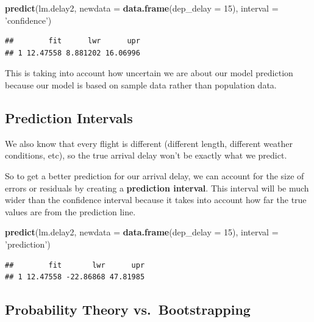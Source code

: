 \documentclass[]{book}
\newenvironment{Shaded}{\begin{snugshade}}{\end{snugshade}}
\newcommand{\DataTypeTok}[1]{\textcolor[rgb]{0.13,0.29,0.53}{#1}}
\newcommand{\DecValTok}[1]{\textcolor[rgb]{0.00,0.00,0.81}{#1}}
\newcommand{\KeywordTok}[1]{\textcolor[rgb]{0.13,0.29,0.53}{\textbf{#1}}}
\newcommand{\NormalTok}[1]{#1}
\newcommand{\StringTok}[1]{\textcolor[rgb]{0.31,0.60,0.02}{#1}}
\begin{document}
\begin{Shaded}
\begin{Highlighting}[]
\KeywordTok{predict}\NormalTok{(lm.delay2, }\DataTypeTok{newdata =} \KeywordTok{data.frame}\NormalTok{(}\DataTypeTok{dep_delay =} \DecValTok{15}\NormalTok{), }\DataTypeTok{interval =} \StringTok{'confidence'}\NormalTok{)}
\end{Highlighting}
\end{Shaded}

\begin{verbatim}
##        fit      lwr      upr
## 1 12.47558 8.881202 16.06996
\end{verbatim}

This is taking into account how uncertain we are about our model prediction because our model is based on sample data rather than population data.

\hypertarget{prediction-intervals}{%
\subsection{Prediction Intervals}\label{prediction-intervals}}

We also know that every flight is different (different length, different weather conditions, etc), so the true arrival delay won't be exactly what we predict.

So to get a better prediction for our arrival delay, we can account for the size of errors or residuals by creating a \textbf{prediction interval}. This interval will be much wider than the confidence interval because it takes into account how far the true values are from the prediction line.

\begin{Shaded}
\begin{Highlighting}[]
\KeywordTok{predict}\NormalTok{(lm.delay2, }\DataTypeTok{newdata =} \KeywordTok{data.frame}\NormalTok{(}\DataTypeTok{dep_delay =} \DecValTok{15}\NormalTok{), }\DataTypeTok{interval =} \StringTok{'prediction'}\NormalTok{)}
\end{Highlighting}
\end{Shaded}

\begin{verbatim}
##        fit       lwr      upr
## 1 12.47558 -22.86868 47.81985
\end{verbatim}

\hypertarget{probability-theory-vs.bootstrapping}{%
\subsection{Probability Theory vs.~Bootstrapping}\label{probability-theory-vs.bootstrapping}}
\end{document}
